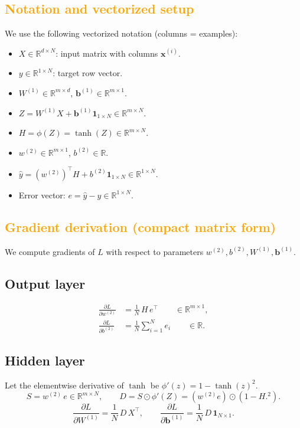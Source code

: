\documentclass[11pt,a4paper]{article}
\begin{document}
\subsection{\textcolor{orange}{Notation and vectorized setup}}
We use the following vectorized notation (columns = examples):
\begin{itemize}
  \item \(X \in \mathbb{R}^{d\times N}\): input matrix with columns \(\mathbf{x}^{(i)}\).
  \item \(y \in \mathbb{R}^{1\times N}\): target row vector.
  \item \(W^{(1)} \in \mathbb{R}^{m\times d}\), \(\mathbf{b}^{(1)}\in\mathbb{R}^{m\times 1}\).
  \item \(Z = W^{(1)}X + \mathbf{b}^{(1)}\mathbf{1}_{1\times N}\in\mathbb{R}^{m\times N}\).
  \item \(H = \phi(Z)=\tanh(Z)\in\mathbb{R}^{m\times N}\).
  \item \(w^{(2)}\in\mathbb{R}^{m\times 1}\), \(b^{(2)}\in\mathbb{R}\).
  \item \(\hat{y} = (w^{(2)})^\top H + b^{(2)}\mathbf{1}_{1\times N}\in\mathbb{R}^{1\times N}.\)
  \item Error vector: \(e = \hat{y} - y \in \mathbb{R}^{1\times N}.\)
\end{itemize}

\subsection{\textcolor{orange}{Gradient derivation (compact matrix form)}}
We compute gradients of \(L\) with respect to parameters \(w^{(2)}, b^{(2)}, W^{(1)}, \mathbf{b}^{(1)}\).

\subsection*{Output layer}
\[
\begin{aligned}
\frac{\partial L}{\partial w^{(2)}}
&= \frac{1}{N}\, H\, e^\top \qquad\in\mathbb{R}^{m\times 1},\\[6pt]
\frac{\partial L}{\partial b^{(2)}}
&= \frac{1}{N}\sum_{i=1}^N e_i \qquad\in\mathbb{R}.
\end{aligned}
\]

\subsection*{Hidden layer}
Let the elementwise derivative of \(\tanh\) be \(\phi'(z) = 1 - \tanh(z)^2\).
\[
S = w^{(2)}\, e \in\mathbb{R}^{m\times N},
\qquad
D = S \odot \phi'(Z) = (w^{(2)} e) \odot (1 - H.^2).
\]
\[
\frac{\partial L}{\partial W^{(1)}} = \frac{1}{N}\, D\, X^\top,\qquad
\frac{\partial L}{\partial \mathbf{b}^{(1)}} = \frac{1}{N}\,D\,\mathbf{1}_{N\times 1}.
\]
\end{document}
